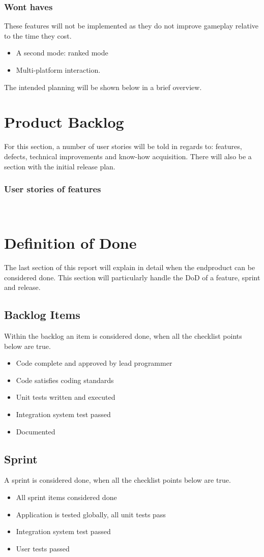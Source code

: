 \documentclass{article}
\begin{document}
\subsubsection{Wont haves}
These features will not be implemented as they do not improve gameplay relative to the time they cost.
\begin{itemize}
    \item A second mode: ranked mode
    \item Multi-platform interaction.
\end{itemize}
The intended planning will be shown below in a brief overview.
\section{Product Backlog}
For this section, a number of user stories will be told in regards to: features, defects,  technical improvements and know-how acquisition. There will also be a section with the initial release plan.
\subsubsection{User stories of features}
\
\section{Definition of Done}
The last section of this report will explain in detail when the endproduct can be considered done. This section will particularly handle the DoD of a feature, sprint and release.
\subsection{Backlog Items}
Within the backlog an item is considered done, when all the checklist points below are true.
\begin{itemize}
	\item Code complete and approved by lead programmer
	\item Code satisfies coding standards
	\item Unit tests written and executed
	\item Integration system test passed
	\item Documented
\end{itemize}
\subsection{Sprint}
A sprint is considered done, when all the checklist points below are true.
\begin{itemize}
	\item All sprint items considered done
	\item Application is tested globally, all unit tests pass
	\item Integration system test passed
	\item User tests passed
\end{itemize}
\end{document}

